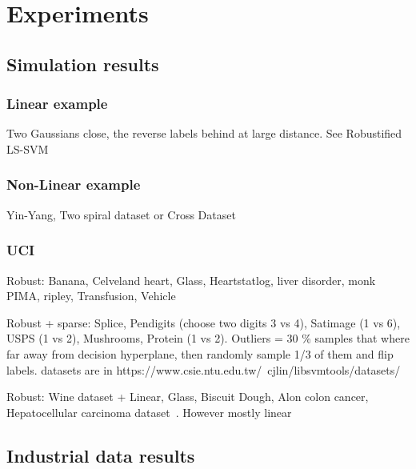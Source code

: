 \documentclass[preprint,12pt]{elsarticle}
\newtheorem*{remark}{Remark}
\begin{document}

	
	\section{Experiments} 
	\label{sec:exp}
	\subsection{Simulation results} 
	
	\subsubsection{Linear example}
	
	Two Gaussians close, the reverse labels behind at large distance. See Robustified LS-SVM~\cite{debruyne2009robustified}
	
	\subsubsection{Non-Linear example}
	
	Yin-Yang, Two spiral dataset or Cross Dataset~\cite{yang2014robust}
	
	\subsubsection{UCI}
	
	Robust: Banana, Celveland heart, Glass, Heartstatlog, liver disorder, monk PIMA, ripley, Transfusion, Vehicle~\cite{yang2014robust}
	
	Robust + sparse: Splice, Pendigits (choose two digits 3 vs 4), Satimage (1 vs 6), USPS (1 vs 2), Mushrooms, Protein (1 vs 2).\cite{chen2018sparse}
	Outliers = 30 \% samples that where far away from decision hyperplane, then randomly sample 1/3 of them and flip labels. datasets are in https://www.csie.ntu.edu.tw/~cjlin/libsvmtools/datasets/ 
	
	Robust: Wine dataset + Linear, Glass, Biscuit Dough, Alon colon cancer, Hepatocellular carcinoma dataset~\cite{debruyne2009robustified}. However mostly linear
	
	\subsection{Industrial data results} 
	
\end{document}

